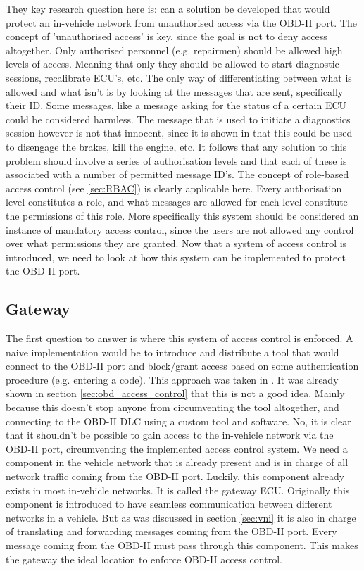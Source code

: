 \documentclass[master=cws,masteroption=vs,english]{kulemt}
\begin{document}
They key research question here is: can a solution be developed that would protect an in-vehicle network from unauthorised access via the OBD-II port. The concept of 'unauthorised access' is key, since the goal is not to deny access altogether. Only authorised personnel (e.g. repairmen) should be allowed high levels of access. Meaning that only they should be allowed to start diagnostic sessions, recalibrate ECU's, etc. The only way of differentiating between what is allowed and what isn't is by looking at the messages that are sent, specifically their ID. Some messages, like a message asking for the status of a certain ECU could be considered harmless. The message that is used to initiate a diagnostics session however is not that innocent, since it is shown in \cite{MillerC} that this could be used to disengage the brakes, kill the engine, etc. It follows that any solution to this problem should involve a series of authorisation levels and that each of these is associated with a number of permitted message ID's. The concept of role-based access control (see \ref{sec:RBAC}) is clearly applicable here. Every authorisation level constitutes a role, and what messages are allowed for each level constitute the permissions of this role. More specifically this system should be considered an instance of mandatory access control, since the users are not allowed any control over what permissions they are granted. Now that a system of access control is introduced, we need to look at how this system can be implemented to protect the OBD-II port.

\subsection{Gateway} 
\label{sec:gateway}

The first question to answer is where this system of access control is enforced. A naive implementation would be to introduce and distribute a tool that would connect to the OBD-II port and block/grant access based on some authentication procedure (e.g. entering a code). This approach was taken in \cite{Yadav16}. It was already shown in section \ref{sec:obd_access_control} that this is not a good idea. Mainly because this doesn't stop anyone from circumventing the tool altogether, and connecting to the OBD-II DLC using a custom tool and software. No, it is clear that it shouldn't be possible to gain access to the in-vehicle network via the OBD-II port, circumventing the implemented access control system. We need a component in the vehicle network that is already present and is in charge of all network traffic coming from the OBD-II port. Luckily, this component already exists in most in-vehicle networks. It is called the gateway ECU. Originally this component is introduced to have seamless communication between different networks in a vehicle. But as was discussed in section \ref{sec:vni} it is also in charge of translating and forwarding messages coming from the OBD-II port. Every message coming from the OBD-II must pass through this component. This makes the gateway the ideal location to enforce OBD-II access control. 
\end{document}
